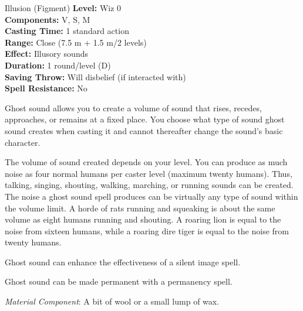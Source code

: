 {Illusion (Figment)}
{
	\textbf{Level:}
	Wiz 0\\
	\textbf{Components:}
	V, S, M\\
	\textbf{Casting Time:}
	1 standard action\\
	\textbf{Range:}
	Close (7.5 m + 1.5 m/2 levels)\\
	\textbf{Effect:}
	Illusory sounds\\
	\textbf{Duration:}
	1 round/level (D)\\
	\textbf{Saving Throw:}
	Will disbelief (if interacted with)\\
	\textbf{Spell Resistance:}
	No\\
}
{
	Ghost sound allows you to create a volume of sound that rises, recedes, approaches, or remains at a fixed place. You choose what type of sound ghost sound creates when casting it and cannot thereafter change the sound's basic character.

	The volume of sound created depends on your level. You can produce as much noise as four normal humans per caster level (maximum twenty humans). Thus, talking, singing, shouting, walking, marching, or running sounds can be created. The noise a ghost sound spell produces can be virtually any type of sound within the volume limit. A horde of rats running and squeaking is about the same volume as eight humans running and shouting. A roaring lion is equal to the noise from sixteen humans, while a roaring dire tiger is equal to the noise from twenty humans.

	Ghost sound can enhance the effectiveness of a silent image spell.

	Ghost sound can be made permanent with a permanency spell.

	\textit{Material Component}:
	A bit of wool or a small lump of wax.

}
